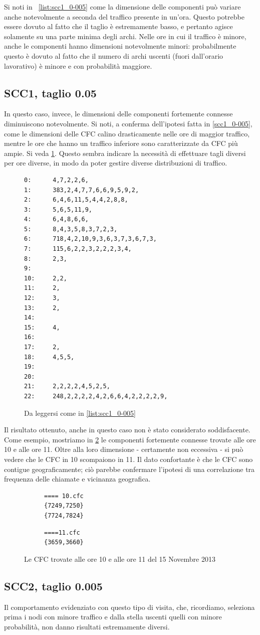 \documentclass[10pt,a4paper]{article}
\begin{document}
Si noti in ~\ref{list:scc1_0-005} come la dimensione delle componenti può variare anche notevolmente a seconda del traffico presente in un'ora. Questo potrebbe essere dovuto al fatto che il taglio è estremamente basso, e pertanto agisce solamente su una parte minima degli archi. Nelle ore in cui il traffico è minore, anche le componenti hanno dimensioni notevolmente minori: probabilmente questo è dovuto al fatto che il numero di archi uscenti (fuori dall'orario lavorativo) è minore e con probabilità maggiore.
\subsection{SCC1, taglio 0.05}
In questo caso, invece, le dimensioni delle componenti fortemente connesse diminuiscono notevolmente. Si noti, a conferma dell'ipotesi fatta in \ref{scc1_0-005}, come le dimensioni delle CFC calino drasticamente nelle ore di maggior traffico, mentre le ore che hanno un traffico inferiore sono caratterizzate da CFC più ampie.
Si veda \ref{list:scc1_0-05}. Questo sembra indicare la necessità di effettuare tagli diversi per ore diverse, in modo da poter gestire diverse distribuzioni di traffico.
\begin{figure}
\begin{verbatim}
0:      4,7,2,2,6,
1:      383,2,4,7,7,6,6,9,5,9,2,
2:      6,4,6,11,5,4,4,2,8,8,
3:      5,6,5,11,9,
4:      6,4,8,6,6,
5:      8,4,3,5,8,3,7,2,3,
6:      718,4,2,10,9,3,6,3,7,3,6,7,3,
7:      115,6,2,2,3,2,2,2,3,4,
8:      2,3,
9:
10:     2,2,
11:     2,
12:     3,
13:     2,
14:
15:     4,
16:
17:     2,
18:     4,5,5,
19:
20:
21:     2,2,2,2,4,5,2,5,
22:     248,2,2,2,2,4,2,6,6,4,2,2,2,2,9,
\end{verbatim}
\caption{Da leggersi come in \ref{list:scc1_0-005}}
\label{list:scc1_0-05}
\end{figure}
Il risultato ottenuto, anche in questo caso non è stato considerato soddisfacente. Come esempio, mostriamo in \ref{list:scc1_0-05_1011cfc} le componenti fortemente connesse trovate alle ore 10 e alle ore 11. Oltre alla loro dimensione - certamente non eccessiva - si può vedere che le CFC in 10 scompaiono in 11.
Il dato confortante è che le CFC sono contigue geograficamente; ciò parebbe confermare l'ipotesi di una correlazione tra frequenza delle chiamate e vicinanza geografica.
\begin{figure}
\begin{subfigure}[b]{1\textwidth}
\begin{verbatim}
==== 10.cfc
{7249,7250}
{7724,7824}
\end{verbatim}
\begin{verbatim}
====11.cfc
{3659,3660}
\end{verbatim}
\end{subfigure}
\caption{Le CFC trovate alle ore 10 e alle ore 11 del 15 Novembre 2013}
\label{list:scc1_0-05_1011cfc}
\end{figure}
\subsection{SCC2, taglio 0.005}
Il comportamento evidenziato con questo tipo di visita, che, ricordiamo, seleziona prima i nodi con minore traffico e dalla stella uscenti quelli con minore probabilità, non danno risultati estremamente diversi.
\end{document}
